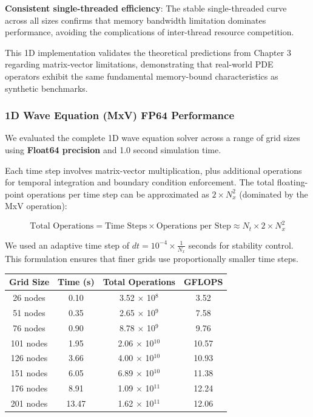
\textbf{Consistent single-threaded efficiency}: The stable single-threaded curve across all sizes confirms that memory bandwidth limitation dominates performance, avoiding the complications of inter-thread resource competition.

This 1D implementation validates the theoretical predictions from Chapter 3 regarding matrix-vector limitations, demonstrating that real-world PDE operators exhibit the same fundamental memory-bound characteristics as synthetic benchmarks.

\clearpage

\subsubsection*{1D Wave Equation (MxV) FP64 Performance}

We evaluated the complete 1D wave equation solver across a range of grid sizes using \textbf{Float64 precision} and 1.0 second simulation time. 

Each time step involves matrix-vector multiplication, plus additional operations for temporal integration and boundary condition enforcement. The total floating-point operations per time step can be approximated as \(2 \times N_x^2\) (dominated by the MxV operation):

\begin{equation}
\text{Total Operations} =  \text{Time Steps} \times \text{Operations per Step} \approx N_t \times 2 \times N_x^2
\end{equation}

We used an adaptive time step of $dt = 10^{-4} \times \frac{1}{N_{x}}$ seconds for stability control. This formulation ensures that finer grids use proportionally smaller time steps.

\vspace{1em}


\begin{tabular*}{\linewidth}{@{\extracolsep{\fill}}cccc}
\toprule
\textbf{Grid Size} & \textbf{Time (s)} & \textbf{Total Operations} & \textbf{GFLOPS} \\
\midrule
26 nodes  & 0.10 & 3.52 $\times$ 10$^{8}$  & 3.52 \\
51 nodes  & 0.35 & 2.65 $\times$ 10$^{9}$  & 7.58 \\
76 nodes  & 0.90 & 8.78 $\times$ 10$^{9}$  & 9.76 \\
101 nodes & 1.95 & 2.06 $\times$ 10$^{10}$ & 10.57 \\
126 nodes & 3.66 & 4.00 $\times$ 10$^{10}$ & 10.93 \\
151 nodes & 6.05 & 6.89 $\times$ 10$^{10}$ & 11.38 \\
176 nodes & 8.91 & 1.09 $\times$ 10$^{11}$ & 12.24 \\
201 nodes & 13.47 & 1.62 $\times$ 10$^{11}$ & 12.06 \\
\bottomrule
\end{tabular*}

